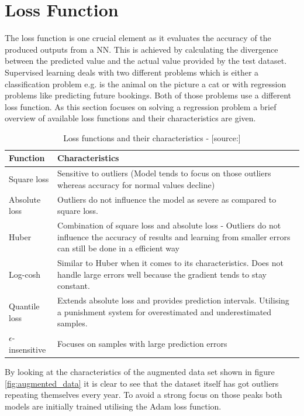 \section{Loss Function}
\label{sec:loss_func}
The loss function is one crucial element as it evaluates the accuracy of the produced outputs from a NN. This is achieved by calculating the divergence between the predicted value and the actual value provided by the test dataset. Supervised learning deals with two different problems which is either a classification problem e.g. is the animal on the picture a cat or with regression problems like predicting future bookings. Both of those problems use a different loss function.\cite{loss_func} As this section focuses on solving a regression problem a brief overview of available loss functions and their characteristics are given. 

\begin{table}[htbp]
	\centering
		\begin{tabularx}{\textwidth}{|l|X|}
		\hline
		\rowcolor[gray]{0.9}
		Function & Characteristics \\
		\hline
		Square loss &Sensitive to outliers (Model tends to focus on those outliers whereas accuracy for normal values decline)\\
		 \hline
		Absolute loss & Outliers do not influence the model as  severe as compared to square loss.  \\
		\hline
		Huber & Combination of square loss and absolute loss - Outliers do not influence the accuracy of results and learning from smaller errors can still be done in a efficient way  \\
		\hline
		Log-cosh & Similar to Huber when it comes to its characteristics. Does not handle large errors well because the gradient tends to stay constant. \\
		\hline
		Quantile loss & Extends absolute loss and provides prediction intervals. Utilising a punishment system for overestimated and underestimated samples. \\
		\hline
		$\epsilon$-insensitive & Focuses on samples with large prediction errors \\
		\hline	
		\end{tabularx}
	\label{tab:loss_function}
	\caption{Loss functions and their characteristics - [source:\cite{loss_func}]}
\end{table}

By looking at the characteristics of the augmented data set shown in figure \ref{fig:augmented_data} it is clear to see that the dataset itself has got outliers repeating themselves every year. To avoid a strong focus on those peaks both models are initially trained utilising the Adam loss function.

